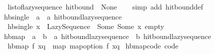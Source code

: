 \begin{isabellebody}
\ \ {\isachardoublequoteopen}list{\isacharunderscore}{\kern0pt}of{\isacharunderscore}{\kern0pt}lazy{\isacharunderscore}{\kern0pt}sequence\ hit{\isacharunderscore}{\kern0pt}bound\ {\isacharequal}{\kern0pt}\ {\isacharbrackleft}{\kern0pt}None{\isacharbrackright}{\kern0pt}{\isachardoublequoteclose}\isanewline
%
\isadelimproof
\ \ %
\endisadelimproof
%
\isatagproof
{}\isamarkupfalse%
\ {\isacharparenleft}{\kern0pt}simp\ add{\isacharcolon}{\kern0pt}\ hit{\isacharunderscore}{\kern0pt}bound{\isacharunderscore}{\kern0pt}def{\isacharparenright}{\kern0pt}%
\endisatagproof
{\isafoldproof}%
%
\isadelimproof
\isanewline
%
\endisadelimproof
\ \ \isanewline
{}\isamarkupfalse%
\ hb{\isacharunderscore}{\kern0pt}single\ {\isacharcolon}{\kern0pt}{\isacharcolon}{\kern0pt}\ {\isachardoublequoteopen}{\isacharprime}{\kern0pt}a\ {\isasymRightarrow}\ {\isacharprime}{\kern0pt}a\ hit{\isacharunderscore}{\kern0pt}bound{\isacharunderscore}{\kern0pt}lazy{\isacharunderscore}{\kern0pt}sequence{\isachardoublequoteclose}\isanewline
{}\isanewline
\ \ {\isachardoublequoteopen}hb{\isacharunderscore}{\kern0pt}single\ x\ {\isacharequal}{\kern0pt}\ Lazy{\isacharunderscore}{\kern0pt}Sequence\ {\isacharparenleft}{\kern0pt}{\isasymlambda}{\isacharunderscore}{\kern0pt}{\isachardot}{\kern0pt}\ Some\ {\isacharparenleft}{\kern0pt}Some\ x{\isacharcomma}{\kern0pt}\ empty{\isacharparenright}{\kern0pt}{\isacharparenright}{\kern0pt}{\isachardoublequoteclose}\isanewline
\isanewline
{}\isamarkupfalse%
\ hb{\isacharunderscore}{\kern0pt}map\ {\isacharcolon}{\kern0pt}{\isacharcolon}{\kern0pt}\ {\isachardoublequoteopen}{\isacharparenleft}{\kern0pt}{\isacharprime}{\kern0pt}a\ {\isasymRightarrow}\ {\isacharprime}{\kern0pt}b{\isacharparenright}{\kern0pt}\ {\isasymRightarrow}\ {\isacharprime}{\kern0pt}a\ hit{\isacharunderscore}{\kern0pt}bound{\isacharunderscore}{\kern0pt}lazy{\isacharunderscore}{\kern0pt}sequence\ {\isasymRightarrow}\ {\isacharprime}{\kern0pt}b\ hit{\isacharunderscore}{\kern0pt}bound{\isacharunderscore}{\kern0pt}lazy{\isacharunderscore}{\kern0pt}sequence{\isachardoublequoteclose}\isanewline
{}\isanewline
\ \ {\isachardoublequoteopen}hb{\isacharunderscore}{\kern0pt}map\ f\ xq\ {\isacharequal}{\kern0pt}\ map\ {\isacharparenleft}{\kern0pt}map{\isacharunderscore}{\kern0pt}option\ f{\isacharparenright}{\kern0pt}\ xq{\isachardoublequoteclose}\isanewline
\isanewline
{}\isamarkupfalse%
\ hb{\isacharunderscore}{\kern0pt}map{\isacharunderscore}{\kern0pt}code\ {\isacharbrackleft}{\kern0pt}code{\isacharbrackright}{\kern0pt}{\isacharcolon}{\kern0pt}\isanewline

\end{isabellebody}
